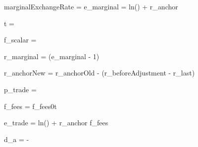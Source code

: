 marginalExchangeRate = e_{marginal} =  \times ln() + r_{anchor}

t = 

f_{scalar} = 

r_{marginal} = (e_{marginal} - 1) \times {}

r_{anchorNew} = r_{anchorOld} - (r_{beforeAdjustment} - r_{last}) \times {}

p_{trade} = 

f_{fees} = f_{fees0}\times t

e_{trade} =  \times ln() + r_{anchor} \pm f_{fees}

d_a = - 